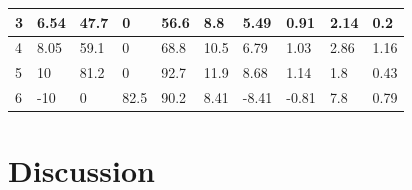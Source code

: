 \begin{table}[hbt!]
\begin{tabular}{|l|l|l|l|l|l|l|l|l|l|}
        3   & 6.54                                              & 47.7                                                & 0                                                   & 56.6                                               & 8.8                                                & 5.49                                              & 0.91                                              & 2.14                                                       & 0.2                                                        \\ \hline
        4   & 8.05                                              & 59.1                                                & 0                                                   & 68.8                                               & 10.5                                               & 6.79                                              & 1.03                                              & 2.86                                                       & 1.16                                                       \\ \hline
        5   & 10                                                & 81.2                                                & 0                                                   & 92.7                                               & 11.9                                               & 8.68                                              & 1.14                                              & 1.8                                                        & 0.43                                                       \\ \hline
        6   & -10                                               & 0                                                   & 82.5                                                & 90.2                                               & 8.41                                               & -8.41                                             & -0.81                                             & 7.8                                                        & 0.79                                                       \\ \hline
    \end{tabular}
\end{table}



\section{Discussion}

